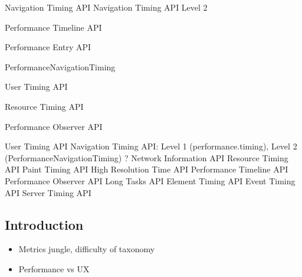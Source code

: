Navigation Timing API %
Navigation Timing API Level 2 %

Performance Timeline API %

Performance Entry API %

PerformanceNavigationTiming %



User Timing API %

Resource Timing API %



Performance Observer API %




User Timing API
Navigation Timing API: Level 1 (performance.timing), Level 2 (PerformanceNavigationTiming) ?
Network Information API
Resource Timing API
Paint Timing API
High Resolution Time API
Performance Timeline API
Performance Observer API
Long Tasks API
Element Timing API
Event Timing API
Server Timing API
















\subsection{Introduction}

\begin{itemize}
\item Metrics jungle, difficulty of taxonomy
\item Performance vs UX
\end{itemize}



